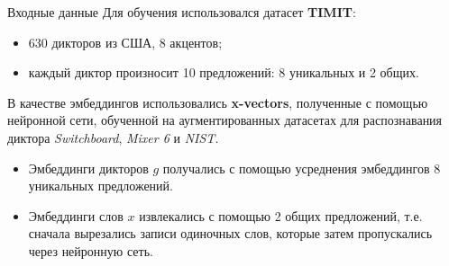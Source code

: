 \documentclass[aspectratio=169]{beamer}
\begin{document}
\begin{frame}{Входные данные}
    Для обучения использовался датасет \textbf{TIMIT}:
    \begin{itemize}
        \item 630 дикторов из США, 8 акцентов;
        \item каждый диктор произносит 10 предложений: 8 уникальных и 2 общих.
    \end{itemize}

    В качестве эмбеддингов использовались \textbf{x-vectors}, полученные с помощью нейронной сети, обученной на аугментированных датасетах для распознавания диктора \textit{Switchboard}, \textit{Mixer 6} и \textit{NIST}.
    \begin{itemize}
        \item Эмбеддинги дикторов $g$ получались с помощью усреднения
        эмбеддингов 8 уникальных предложений.
        \item Эмбеддинги слов $x$ извлекались с помощью 2 общих предложений,
        т.е. сначала вырезались записи одиночных слов, которые затем
        пропускались через нейронную сеть.
    \end{itemize}
\end{frame}
\end{document}
